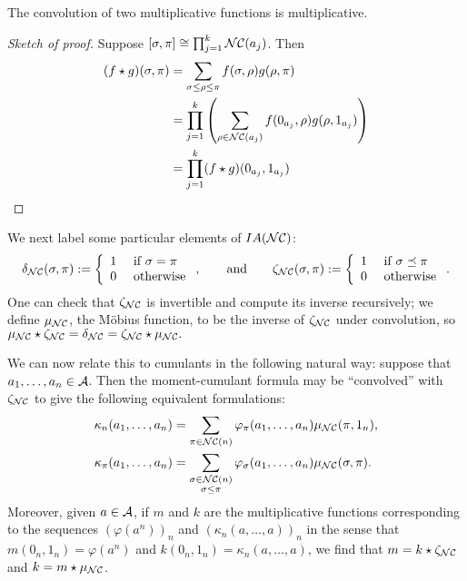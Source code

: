 \begin{proposition}
	\label{prop:mcmism}
	The convolution of two multiplicative functions is multiplicative.
\end{proposition}

\begin{proof}[Sketch of proof]
	Suppose $[\sigma, \pi] \cong \prod_{j=1}^k \mathcal{NC}(a_j)$.
	Then
	\begin{align*}
		(f\star g)(\sigma, \pi)
		&= \sum_{\sigma\leq\rho\leq\pi} f(\sigma, \rho)g(\rho, \pi)\\
		&= \prod_{j=1}^k\left(\sum_{\rho\in\mathcal{NC}(a_j)}f(0_{a_j}, \rho)g(\rho, 1_{a_j})\right)\\
		&= \prod_{j=1}^k (f\star g)(0_{a_j}, 1_{a_j})
	\end{align*}
\end{proof}

We next label some particular elements of $IA(\mathcal{NC})$:
$$\delta_{\mathcal{NC}}(\sigma, \pi) := \left\{\begin{array}{ll}1&\text{ if } \sigma = \pi \\0& \text{ otherwise}\end{array}\right.,
	\qquad\text{and}\qquad
	\zeta_{\mathcal{NC}}(\sigma, \pi) := \left\{\begin{array}{ll}1&\text{ if } \sigma \preceq \pi \\0 & \text{ otherwise}\end{array}\right..$$
One can check that $\zeta_{\mathcal{NC}}$ is invertible and compute its inverse recursively; we define $\mu_{\mathcal{NC}}$, the M\"obius function, to be the inverse of $\zeta_{\mathcal{NC}}$ under convolution, so $\mu_{\mathcal{NC}}\star\zeta_{\mathcal{NC}} = \delta_{\mathcal{NC}} = \zeta_{\mathcal{NC}}\star\mu_{\mathcal{NC}}.$

We can now relate this to cumulants in the following natural way: suppose that $a_1, \ldots, a_n \in \mathcal{A}$.
Then the moment-cumulant formula may be ``convolved'' with $\zeta_{\mathcal{NC}}$ to give the following equivalent formulations:
\begin{align*}
	\kappa_n(a_1, \ldots, a_n) &= \sum_{\pi \in \mathcal{NC}(n)} \varphi_\pi(a_1, \ldots, a_n) \mu_{\mathcal{NC}}(\pi, 1_n), \\
	\kappa_\pi(a_1, \ldots, a_n) &= \sum_{\substack{\sigma \in \mathcal{NC}(n) \\ \sigma \leq \pi}} \varphi_\sigma(a_1, \ldots, a_n) \mu_{\mathcal{NC}}(\sigma, \pi).
\end{align*}
Moreover, given $a \in \mathcal{A}$, if $m$ and $k$ are the multiplicative functions corresponding to the sequences $(\varphi(a^n))_n$ and $(\kappa_n(a, \ldots, a))_n$ in the sense that $m(0_n, 1_n) = \varphi(a^n)$ and $k(0_n, 1_n) = \kappa_n(a, \ldots, a)$, we find that $m = k \star \zeta_{\mathcal{NC}}$ and $k = m \star \mu_{\mathcal{NC}}$.

